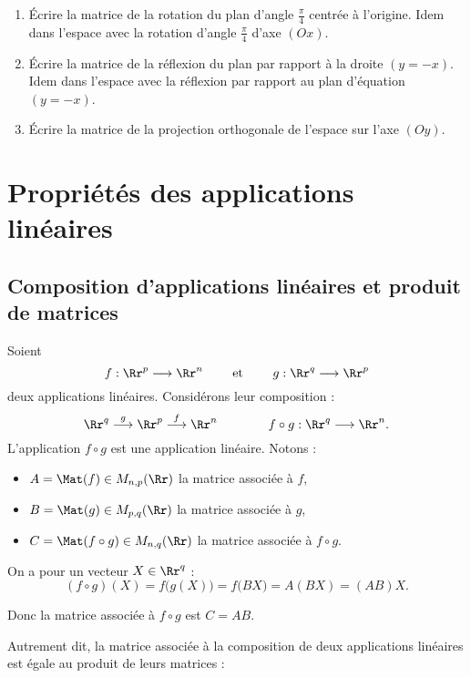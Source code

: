 \documentclass[class=report,crop=false]{standalone}
\begin{document}
\begin{miniexercices}
\begin{enumerate}
  \item \'Ecrire la matrice de la rotation du plan d'angle $\frac\pi4$ centrée à l'origine.
 Idem dans l'espace avec la rotation d'angle $\frac\pi4$ d'axe $(Ox)$.

  \item \'Ecrire la matrice de la réflexion du plan par rapport à la droite $(y=-x)$.
 Idem dans l'espace avec la réflexion par rapport au plan d'équation $(y=-x)$.

 \item\'Ecrire la matrice de la projection orthogonale de l'espace sur l'axe $(Oy)$.

\end{enumerate}
\end{miniexercices}


\section{Propriétés des applications linéaires}
\subsection{Composition d'applications linéaires et produit de matrices}


Soient
$$f : \Rr^p \longrightarrow \Rr^n \qquad \text{ et } \qquad g : \Rr^q \longrightarrow \Rr^p$$
deux applications linéaires.
Considérons leur composition :
$$\Rr^q \overset{g}{\longrightarrow} \Rr^p\overset{f}{\longrightarrow} \Rr^n
 \qquad \qquad
f \circ g :  \Rr^q \longrightarrow \Rr^n.
$$
L'application $f \circ g$ est une application linéaire.
Notons :
\begin{itemize}
  \item $A = \Mat(f) \in M_{n,p}(\Rr)$ la matrice associée à $f$,
  \item $B = \Mat(g) \in M_{p,q}(\Rr)$ la matrice associée à $g$,
  \item $C = \Mat(f \circ g) \in M_{n,q}(\Rr)$ la matrice associée à $f \circ g$.
\end{itemize}

On a pour un vecteur $X \in \Rr^q$ :
$$(f \circ g)(X)  =  f \big(g(X)\big) = f\big( BX \big) = A(BX) = (AB)X.$$

Donc la matrice associée à $f\circ g$ est $C=AB$.


Autrement dit, la matrice associée à la composition de deux applications linéaires est
égale au produit de leurs matrices :
\end{document}
